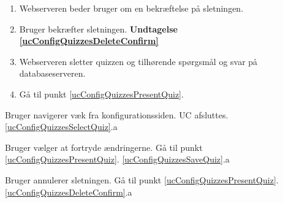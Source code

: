	\begin{enumerate}
		\item Webserveren beder bruger om en bekræftelse på sletningen.
		
		\item\label{ucConfigQuizzesDeleteConfirm} Bruger bekræfter sletningen. \textbf{Undtagelse \ref{ucConfigQuizzesDeleteConfirm}}
		
		\item Webserveren sletter quizzen og tilhørende spørgsmål og svar på databaseserveren.
		
		\item Gå til punkt \ref{ucConfigQuizzesPresentQuiz}.
		
	\end{enumerate}

\ucdescriptionend %

\ucextension
	{Bruger navigerer væk fra konfigurationssiden.}
	{UC afsluttes.}
	{\ref{ucConfigQuizzesSelectQuiz}.a}

\ucextension
	{Bruger vælger at fortryde ændringerne.}
	{Gå til punkt \ref{ucConfigQuizzesPresentQuiz}.}
	{\ref{ucConfigQuizzesSaveQuiz}.a}

\ucextension
	{Bruger annulerer sletningen.}
	{Gå til punkt \ref{ucConfigQuizzesPresentQuiz}.}
	{\ref{ucConfigQuizzesDeleteConfirm}.a}

